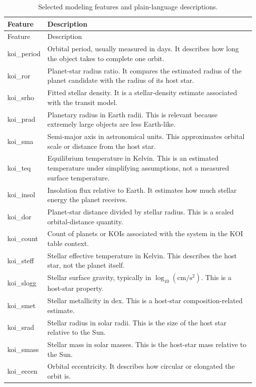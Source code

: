 \documentclass[11pt]{article}
\begin{document}
\begin{longtable}{>{\ttfamily}p{}p{}}
\caption{Selected modeling features and plain-language descriptions.}
\label{tab:features}\\
\toprule
\normalfont Feature & Description \\
\midrule
\endfirsthead
\toprule
\normalfont Feature & Description \\
\midrule
\endhead
koi\_period & Orbital period, usually measured in days. It describes how long the object takes to complete one orbit. \\
koi\_ror & Planet-star radius ratio. It compares the estimated radius of the planet candidate with the radius of its host star. \\
koi\_srho & Fitted stellar density. It is a stellar-density estimate associated with the transit model. \\
koi\_prad & Planetary radius in Earth radii. This is relevant because extremely large objects are less Earth-like. \\
koi\_sma & Semi-major axis in astronomical units. This approximates orbital scale or distance from the host star. \\
koi\_teq & Equilibrium temperature in Kelvin. This is an estimated temperature under simplifying assumptions, not a measured surface temperature. \\
koi\_insol & Insolation flux relative to Earth. It estimates how much stellar energy the planet receives. \\
koi\_dor & Planet-star distance divided by stellar radius. This is a scaled orbital-distance quantity. \\
koi\_count & Count of planets or KOIs associated with the system in the KOI table context. \\
koi\_steff & Stellar effective temperature in Kelvin. This describes the host star, not the planet itself. \\
koi\_slogg & Stellar surface gravity, typically in $\log_{10}(\mathrm{cm}/\mathrm{s}^2)$. This is a host-star property. \\
koi\_smet & Stellar metallicity in dex. This is a host-star composition-related estimate. \\
koi\_srad & Stellar radius in solar radii. This is the size of the host star relative to the Sun. \\
koi\_smass & Stellar mass in solar masses. This is the host-star mass relative to the Sun. \\
koi\_eccen & Orbital eccentricity. It describes how circular or elongated the orbit is. \\
\bottomrule
\end{longtable}
\end{document}
